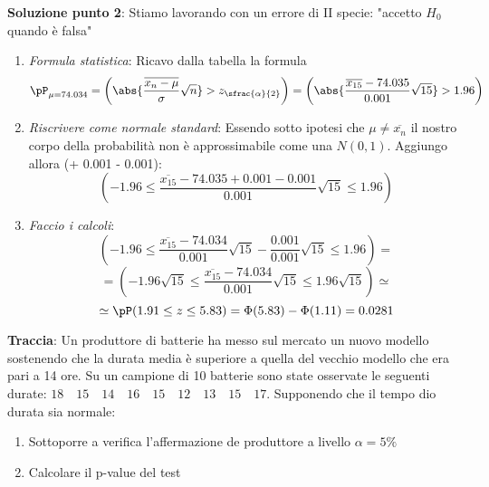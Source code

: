 \ind \textbf{Soluzione punto 2}:  Stiamo lavorando con un errore di II specie: "accetto $H_0$ quando è falsa"
\begin{enumerate}
    \item \textit{Formula statistica}: Ricavo dalla tabella la formula $$\pP_{\mu = 74.034}= \left( {\abs{ \dfrac{\overline{x_n - \mu }}{\sigma} \sqrt{n}} > z_{\sfrac{\alpha}{2}}} \right) = \left( {\abs{ \dfrac{\overline{x_{15}} - 74.035 }{0.001} \sqrt{15}}} > 1.96 \right) $$
    \item \textit{Riscrivere come normale standard}: Essendo sotto ipotesi che $\mu \neq \overline{x_n}$ il nostro corpo della probabilità non è approssimabile come una $N(0,1)$. Aggiungo allora (+ 0.001 - 0.001): $$ \left(-1.96 \leq \dfrac{\overline{x_{15}} - 74.035 + 0.001 - 0.001}{0.001} \sqrt{15} \leq 1.96 \right)$$
    \item \textit{Faccio i calcoli}: $$\left(-1.96 \leq \dfrac{\overline{x_{15}} - 74.034}{0.001} \sqrt{15} - \dfrac{0.001}{0.001}\sqrt{15} \leq 1.96 \right) = $$ $$ = \left(-1.96 \sqrt{15} \leq \dfrac{\overline{x_{15}} - 74.034}{0.001} \sqrt{15} \leq 1.96 \sqrt{15} \right) \simeq $$ $$ \simeq \pP(1.91 \leq z \leq 5.83) = \Phi(5.83) - \Phi(1.11) = 0.0281$$
\end{enumerate}

\ind \textbf{Traccia}: Un produttore di batterie ha messo sul mercato un nuovo modello sostenendo che la durata media è superiore a quella del vecchio modello che era pari a 14 ore. Su un campione di 10 batterie sono state osservate le seguenti durate: $18 \quad 15\quad 14\quad 16\quad 15\quad 12\quad 13\quad 15\quad 17$. Supponendo che il tempo dio durata sia normale:
\begin{enumerate}
    \item Sottoporre a verifica l'affermazione de produttore a livello $\alpha=5\%$
    \item Calcolare il p-value del test
\end{enumerate}

